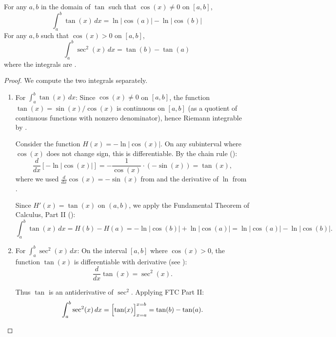 \begin{proposition} \label{proposition:integrals_of_tangent_and_secant}
For any $a, b$ in the domain of $\tan$ such that $\cos(x) \neq 0$ on $[a,b]$,
$$\int_a^b \tan(x) \, dx = \ln|\cos(a)| - \ln|\cos(b)|$$
For any $a, b$ such that $\cos(x) > 0$ on $[a,b]$,
$$\int_a^b \sec^2(x) \, dx = \tan(b) - \tan(a)$$
where the integrals are .
\end{proposition}
\begin{proof}
    We compute the two integrals separately.

    \begin{enumerate}
        \item For $\int_a^b \tan(x)\,dx$: Since $\cos(x) \neq 0$ on $[a, b]$, the function $\tan(x) = \sin(x)/\cos(x)$ is continuous on $[a, b]$ (as a quotient of continuous functions with nonzero denominator), hence Riemann integrable by .

        Consider the function $H(x) = -\ln|\cos(x)|$. On any subinterval where $\cos(x)$ does not change sign, this is differentiable. By the chain rule ():
        $$\frac{d}{dx} \left[-\ln|\cos(x)|\right] = -\frac{1}{\cos(x)} \cdot (-\sin(x)) = \tan(x),$$
        where we used $\frac{d}{dx}\cos(x) = -\sin(x)$ from  and the derivative of $\ln$ from .

        Since $H'(x) = \tan(x)$ on $(a, b)$, we apply the Fundamental Theorem of Calculus, Part II ():
        $$\int_a^b \tan(x)\,dx = H(b) - H(a) = -\ln|\cos(b)| + \ln|\cos(a)| = \ln|\cos(a)| - \ln|\cos(b)|.$$

        \item For $\int_a^b \sec^2(x)\,dx$: On the interval $[a, b]$ where $\cos(x) > 0$, the function $\tan(x)$ is differentiable with derivative (see ):
        $$\frac{d}{dx} \tan(x) = \sec^2(x).$$

        Thus $\tan$ is an antiderivative of $\sec^2$. Applying FTC Part II:
        $$\int_a^b \sec^2(x)\,dx = \Bigl[\tan(x)\Bigr]_{x=a}^{x=b} = \tan(b) - \tan(a).$$
    \end{enumerate}
\end{proof}
